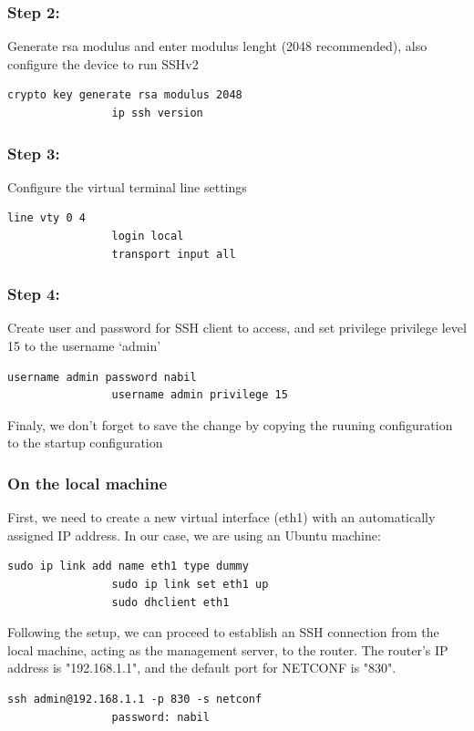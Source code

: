 \subsubsection{Step 2:}
Generate rsa modulus and enter modulus lenght (2048 recommended), also configure the device to run SSHv2
\begin{lstlisting}[style=xmlStyle,  backgroundcolor=\color{codebackground}]
                crypto key generate rsa modulus 2048 
                ip ssh version 
\end{lstlisting}
\subsubsection{Step 3:}
Configure the virtual terminal line settings
\begin{lstlisting}[style=xmlStyle,  backgroundcolor=\color{codebackground}]
                line vty 0 4 
                login local
                transport input all
\end{lstlisting}
\subsubsection{Step 4:}
Create user and password for SSH client to access, and set privilege privilege level 15 to the username ‘admin’
\begin{lstlisting}[style=xmlStyle,  backgroundcolor=\color{codebackground}]
                username admin password nabil 
                username admin privilege 15 
\end{lstlisting}
\indent Finaly, we don't forget to save the change by copying the ruuning configuration to the startup configuration
\subsubsection{On the local machine}
\indent First, we need to create a new virtual interface (eth1) with an automatically assigned IP address. In our case, we are using an Ubuntu machine:
\begin{lstlisting}[style=xmlStyle,  backgroundcolor=\color{codebackground}]
                sudo ip link add name eth1 type dummy
                sudo ip link set eth1 up
                sudo dhclient eth1
\end{lstlisting}
Following the setup, we can proceed to establish an SSH connection from the local machine, acting as the management server, to the router. The router's IP address is "192.168.1.1", and the default port for NETCONF is "830".
\begin{lstlisting}[style=ubuntutermStyle,  backgroundcolor=\color{codebackground}]
                ssh admin@192.168.1.1 -p 830 -s netconf 
                password: nabil
\end{lstlisting}

